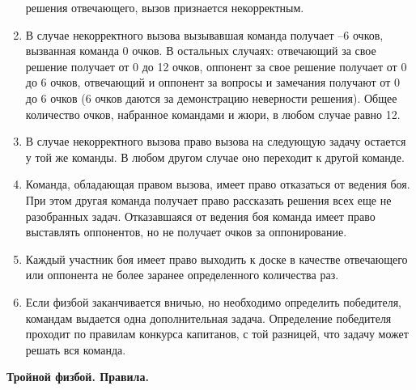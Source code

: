 \documentclass[11pt]{article}
\newlength{\h}
\newlength{\x}
\begin{document}
\begin{enumerate}
  решения отвечающего, вызов признается некорректным.
\item В случае некорректного вызова вызывавшая команда получает –6
  очков, вызванная команда 0 очков. В остальных случаях: отвечающий за
  свое решение получает от 0 до 12 очков, оппонент за свое решение
  получает от 0 до 6 очков, отвечающий и оппонент за вопросы и
  замечания получают от 0 до 6 очков (6 очков даются за демонстрацию
  неверности решения). Общее количество очков, набранное командами и
  жюри, в любом случае равно 12.
\item В случае некорректного вызова право вызова на следующую задачу
  остается у той же команды. В любом другом случае оно переходит к
  другой команде.
\item Команда, обладающая правом вызова, имеет право отказаться от
  ведения боя. При этом другая команда получает право рассказать
  решения всех еще не разобранных задач. Отказавшаяся от ведения боя
  команда имеет право выставлять оппонентов, но не получает очков за
  оппонирование.
\item Каждый участник боя имеет право выходить к доске в качестве
  отвечающего или оппонента не более заранее определенного количества
  раз.
\item Если физбой заканчивается вничью, но необходимо определить
  победителя, командам выдается одна дополнительная
  задача. Определение победителя проходит по правилам конкурса
  капитанов, с той разницей, что задачу может решать вся команда.
\end{enumerate}

\clearpage
{}
\thispagestyle{empty}
\begin{center}
  \textbf{Тройной физбой. Правила.}
\end{center}
\end{document}
